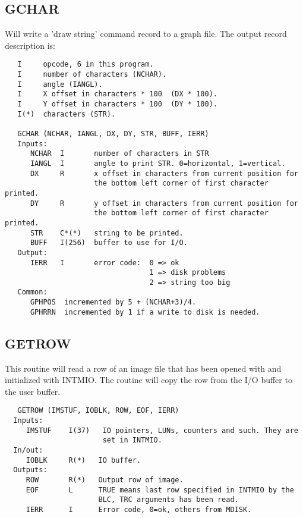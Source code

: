 \subsection{GCHAR}
Will write a 'draw string' command record to a graph file.
The output record description is:
\begin{verbatim}
   I     opcode, 6 in this program.
   I     number of characters (NCHAR).
   I     angle (IANGL).
   I     X offset in characters * 100  (DX * 100).
   I     Y offset in characters * 100  (DY * 100).
   I(*)  characters (STR).

   GCHAR (NCHAR, IANGL, DX, DY, STR, BUFF, IERR)
   Inputs:
      NCHAR  I       number of characters in STR
      IANGL  I       angle to print STR. 0=horizontal, 1=vertical.
      DX     R       x offset in characters from current position for
                     the bottom left corner of first character printed.
      DY     R       y offset in characters from current position for
                     the bottom left corner of first character printed.
      STR    C*(*)   string to be printed.
      BUFF   I(256)  buffer to use for I/O.
   Output:
      IERR   I       error code:  0 => ok
                                  1 => disk problems
                                  2 => string too big
   Common:
      GPHPOS  incremented by 5 + (NCHAR+3)/4.
      GPHRRN  incremented by 1 if a write to disk is needed.

\end{verbatim}

\subsection{GETROW}
This routine will read a row of an image file that has been opened
with and initialized with INTMIO.  The routine will copy the
row from the I/O buffer to the user buffer.
\begin{verbatim}
   GETROW (IMSTUF, IOBLK, ROW, EOF, IERR)
  Inputs:
     IMSTUF    I(37)   IO pointers, LUNs, counters and such. They are
                       set in INTMIO.
  In/out:
     IOBLK     R(*)   IO buffer.
  Outputs:
     ROW       R(*)   Output row of image.
     EOF       L      TRUE means last row specified in INTMIO by the
                      BLC, TRC arguments has been read.
     IERR      I      Error code, 0=ok, others from MDISK.
\end{verbatim}

